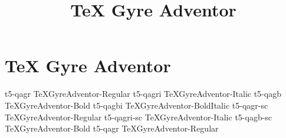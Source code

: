 \documentclass[sample]{vnsample}
\title{TeX Gyre Adventor}
\begin{document}
\section{TeX Gyre Adventor}
    {t5-qagr}     {TeXGyreAdventor-Regular}
   {t5-qagri}    {TeXGyreAdventor-Italic}
    {t5-qagb}     {TeXGyreAdventor-Bold}
   {t5-qagbi}    {TeXGyreAdventor-BoldItalic}
   {t5-qagr-sc}  {TeXGyreAdventor-Regular}
 {t5-qagri-sc} {TeXGyreAdventor-Italic}
   {t5-qagb-sc}  {TeXGyreAdventor-Bold}
    {t5-qagr}     {TeXGyreAdventor-Regular}
\end{document}
